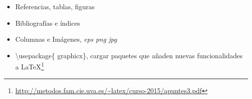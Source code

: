 \begin{frame}{}
    \begin{itemize}
       
        \item Referencias, tablas, figuras
        
        \item Bibliografías e índices
        \item Columnas e Imágenes, \textit{eps png jpg}
         \item \textbackslash usepackage\{ graphicx\}, cargar paquetes que añaden nuevas funcionalidades a LaTeX\footnote{\url{http://metodos.fam.cie.uva.es/~latex/curso-2015/apuntes3.pdf}}
    \end{itemize}
    
\end{frame}